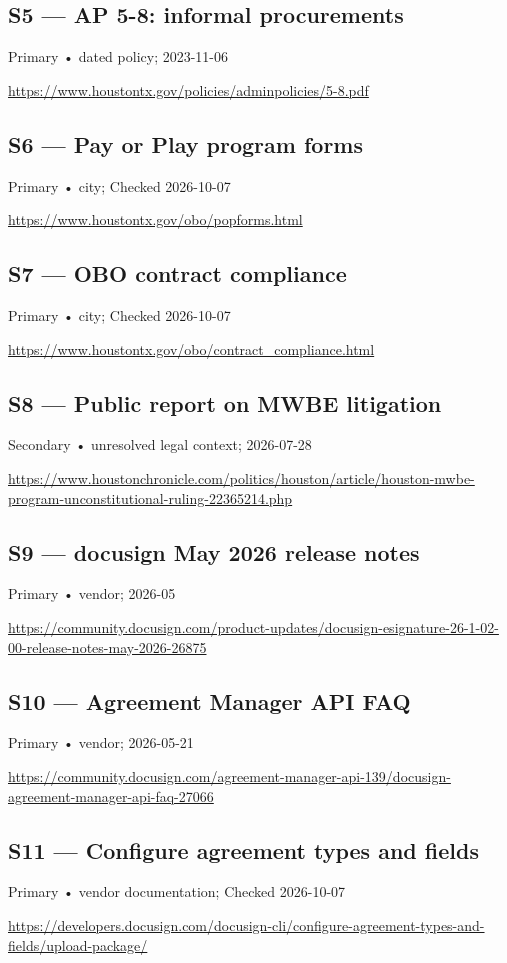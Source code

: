 \documentclass[11pt,letterpaper]{article}
\begin{document}
\subsection*{S5 — AP 5-8: informal procurements}\label{src:S5}
Primary • dated policy; 2023-11-06\par
\url{https://www.houstontx.gov/policies/adminpolicies/5-8.pdf}

\subsection*{S6 — Pay or Play program forms}\label{src:S6}
Primary • city; Checked 2026-10-07\par
\url{https://www.houstontx.gov/obo/popforms.html}

\subsection*{S7 — OBO contract compliance}\label{src:S7}
Primary • city; Checked 2026-10-07\par
\url{https://www.houstontx.gov/obo/contract_compliance.html}

\subsection*{S8 — Public report on MWBE litigation}\label{src:S8}
Secondary • unresolved legal context; 2026-07-28\par
\url{https://www.houstonchronicle.com/politics/houston/article/houston-mwbe-program-unconstitutional-ruling-22365214.php}

\subsection*{S9 — docusign May 2026 release notes}\label{src:S9}
Primary • vendor; 2026-05\par
\url{https://community.docusign.com/product-updates/docusign-esignature-26-1-02-00-release-notes-may-2026-26875}

\subsection*{S10 — Agreement Manager API FAQ}\label{src:S10}
Primary • vendor; 2026-05-21\par
\url{https://community.docusign.com/agreement-manager-api-139/docusign-agreement-manager-api-faq-27066}

\subsection*{S11 — Configure agreement types and fields}\label{src:S11}
Primary • vendor documentation; Checked 2026-10-07\par
\url{https://developers.docusign.com/docusign-cli/configure-agreement-types-and-fields/upload-package/}
\end{document}
